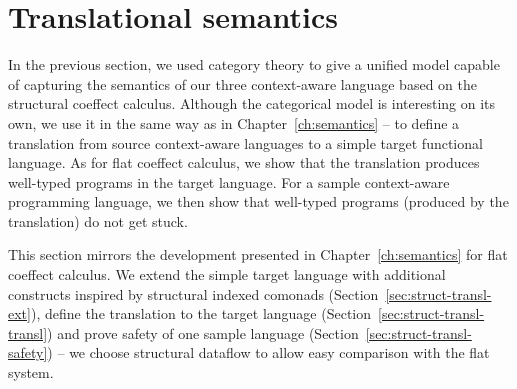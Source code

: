 %
%

\section{Translational semantics}
\label{sec:struct-transl}

In the previous section, we used category theory to give a unified model capable of capturing
the semantics of our three context-aware language based on the structural coeffect calculus.
Although the categorical model is interesting on its own, we use it in the same way as in
Chapter~\ref{ch:semantics} -- to define a translation from source context-aware languages to a
simple target functional language. As for flat coeffect calculus, we show that the translation
produces well-typed programs in the target language. For a sample context-aware programming
language, we then show that well-typed programs (produced by the translation) do not get stuck.

This section mirrors the development presented in Chapter~\ref{ch:semantics} for flat coeffect
calculus. We extend the simple target language with additional constructs inspired by structural
indexed comonads (Section~\ref{sec:struct-transl-ext}), define the translation to the target
language (Section~\ref{sec:struct-transl-transl}) and prove safety of one sample language
(Section~\ref{sec:struct-transl-safety}) -- we choose structural dataflow to allow easy
comparison with the flat system.


